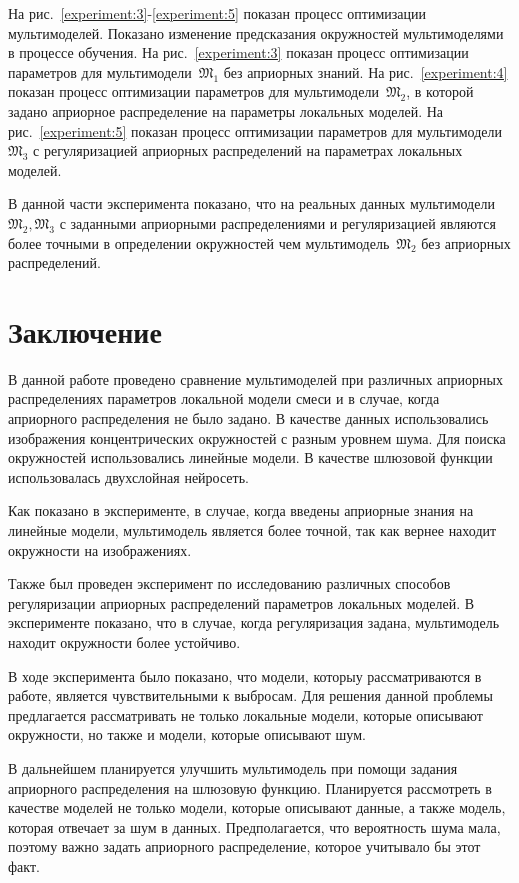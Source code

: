 \documentclass[12pt, twoside]{article}
\numberwithin{equation}{section}
\begin{document}
На рис.~\ref{experiment:3}-\ref{experiment:5} показан процесс оптимизации мультимоделей. Показано изменение предсказания окружностей мультимоделями в процессе обучения. На рис.~\ref{experiment:3} показан процесс оптимизации параметров для мультимодели~$\mathfrak{M}_1$ без априорных знаний. На рис.~\ref{experiment:4} показан процесс оптимизации параметров для мультимодели~$\mathfrak{M}_2$, в которой задано априорное распределение на параметры локальных моделей. На рис.~\ref{experiment:5} показан процесс оптимизации параметров для мультимодели~$\mathfrak{M}_3$ с регуляризацией априорных распределений на параметрах локальных моделей.

В данной части эксперимента показано, что на реальных данных мультимодели~$\mathfrak{M}_2, \mathfrak{M}_3$ с заданными априорными распределениями и регуляризацией являются более точными в определении окружностей чем мультимодель~$\mathfrak{M}_2$ без априорных распределений.


\section{Заключение}
В данной работе проведено сравнение мультимоделей при различных априорных распределениях параметров локальной модели смеси и в случае, когда априорного распределения не было задано. В качестве данных использовались изображения концентрических окружностей с разным уровнем шума. Для поиска окружностей использовались линейные модели. В качестве шлюзовой функции использовалась двухслойная нейросеть.

Как показано в эксперименте, в случае, когда введены априорные знания на линейные модели, мультимодель является более точной, так как вернее находит окружности на изображениях.

Также был проведен эксперимент по исследованию различных способов регуляризации априорных распределений параметров локальных моделей. В эксперименте показано, что в случае, когда регуляризация задана, мультимодель находит окружности более устойчиво.

В ходе эксперимента было показано, что модели, которыу рассматриваются в работе, является чувствительными к выбросам. Для решения данной проблемы предлагается рассматривать не только локальные модели, которые описывают окружности, но также и модели, которые описывают шум. 

В дальнейшем планируется улучшить мультимодель при помощи задания априорного распределения на шлюзовую функцию. Планируется рассмотреть в качестве моделей не только модели, которые описывают данные, а также модель, которая отвечает за шум в данных. Предполагается, что вероятность шума мала, поэтому важно задать априорного распределение, которое учитывало бы этот факт.
\end{document}
